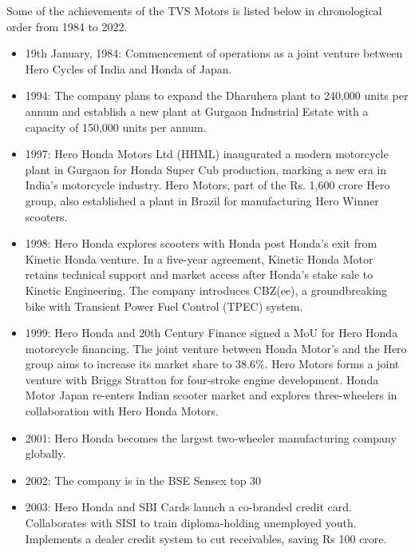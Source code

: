 Some of the achievements of the TVS Motors is listed below in chronological order from 1984 to 2022. \cite{herogroupHeroGroupAcheivements}

\begin{itemize}
	\item 19th January, 1984:
	Commencement of operations as a joint venture between Hero Cycles of India and Honda of Japan.
	
	\item 1994:
	The company plans to expand the Dharuhera plant to 240,000 units per annum and establish a new plant at Gurgaon Industrial Estate with a capacity of 150,000 units per annum.
	
	\item 1997:
	Hero Honda Motors Ltd (HHML) inaugurated a modern motorcycle plant in Gurgaon for Honda Super Cub production, marking a new era in India's motorcycle industry. Hero Motors, part of the Rs. 1,600 crore Hero group, also established a plant in Brazil for manufacturing Hero Winner scooters.
	
	\item 1998:
	Hero Honda explores scooters with Honda post Honda's exit from Kinetic Honda venture. In a five-year agreement, Kinetic Honda Motor retains technical support and market access after Honda's stake sale to Kinetic Engineering. The company introduces CBZ(ee), a groundbreaking bike with Transient Power Fuel Control (TPEC) system.
	
	\item 1999:
	Hero Honda and 20th Century Finance signed a MoU for Hero Honda motorcycle financing. The joint venture between Honda Motor’s and the Hero group aims to increase its market share to 38.6\%. Hero Motors forms a joint venture with Briggs Stratton for four-stroke engine development. Honda Motor Japan re-enters Indian scooter market and explores three-wheelers in collaboration with Hero Honda Motors.
	
	\item 2001:
	Hero Honda becomes the largest two-wheeler manufacturing company globally.
	
	\item 2002:
	The company is in the BSE Sensex top 30
	
	\item 2003:
	Hero Honda and SBI Cards launch a co-branded credit card. Collaborates with SISI to train diploma-holding unemployed youth. Implements a dealer credit system to cut receivables, saving Rs 100 crore.
	

\end{itemize}
